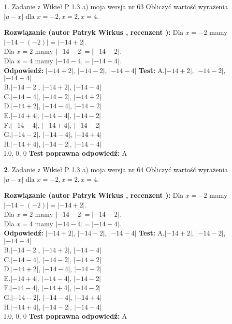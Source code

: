 \documentclass[12pt, a4paper]{article}
\theoremstyle{definition} %
\newtheorem{zad}{}
\newcommand{\zadStart}[1]{\begin{zad}#1\newline}
\newcommand{\zadStop}{\end{zad}}
\newcommand{\rozwStart}[2]{\noindent \textbf{Rozwiązanie (autor #1 , recenzent #2): }\newline}
\newcommand{\rozwStop}{\newline}
\newcommand{\odpStart}{\noindent \textbf{Odpowiedź:}\newline}
\newcommand{\odpStop}{\newline}
\newcommand{\testStart}{\noindent \textbf{Test:}\newline}
\newcommand{\testStop}{\newline}
\newcommand{\kluczStart}{\noindent \textbf{Test poprawna odpowiedź:}\newline}
\newcommand{\kluczStop}{\newline}
\begin{document}
\zadStart{Zadanie z Wikieł P 1.3 a) moja wersja nr 63}
Obliczyć wartość wyrażenia $|a - x|$ dla $x=-2,x=2,x=4$.
\zadStop
\rozwStart{Patryk Wirkus}{}
Dla $x = -2$ mamy $|-14 - (-2)| = |-14 + 2|$.\\
Dla $x = 2$ mamy $|-14 - 2| = |-14 - 2|$.\\
Dla $x = 4$ mamy $|-14 - 4| = |-14 - 4|$.\\
\rozwStop
\odpStart
$|-14 + 2|$, $|-14 - 2|$, $|-14 - 4|$
\odpStop
\testStart
A.$|-14 + 2|$, $|-14 - 2|$, $|-14 - 4|$\\
B.$|-14 - 2|$, $|-14 + 2|$, $|-14 - 4|$\\
C.$|-14 - 4|$, $|-14 - 2|$, $|-14 + 2|$\\
D.$|-14 + 2|$, $|-14 - 4|$, $|-14 - 2|$\\
E.$|-14 + 4|$, $|-14 - 4|$, $|-14 - 2|$\\
F.$|-14 - 4|$, $|-14 + 4|$, $|-14 - 2|$\\
G.$|-14 - 2|$, $|-14 - 4|$, $|-14 + 4|$\\
H.$|-14 + 4|$, $|-14 - 2|$, $|-14 - 4|$\\
I.$0$, $0$, $0$
\testStop
\kluczStart
A
\kluczStop



\zadStart{Zadanie z Wikieł P 1.3 a) moja wersja nr 64}
Obliczyć wartość wyrażenia $|a - x|$ dla $x=-2,x=2,x=4$.
\zadStop
\rozwStart{Patryk Wirkus}{}
Dla $x = -2$ mamy $|-14 - (-2)| = |-14 + 2|$.\\
Dla $x = 2$ mamy $|-14 - 2| = |-14 - 2|$.\\
Dla $x = 4$ mamy $|-14 - 4| = |-14 - 4|$.\\
\rozwStop
\odpStart
$|-14 + 2|$, $|-14 - 2|$, $|-14 - 4|$
\odpStop
\testStart
A.$|-14 + 2|$, $|-14 - 2|$, $|-14 - 4|$\\
B.$|-14 - 2|$, $|-14 + 2|$, $|-14 - 4|$\\
C.$|-14 - 4|$, $|-14 - 2|$, $|-14 + 2|$\\
D.$|-14 + 2|$, $|-14 - 4|$, $|-14 - 2|$\\
E.$|-14 + 4|$, $|-14 - 4|$, $|-14 - 2|$\\
F.$|-14 - 4|$, $|-14 + 4|$, $|-14 - 2|$\\
G.$|-14 - 2|$, $|-14 - 4|$, $|-14 + 4|$\\
H.$|-14 + 4|$, $|-14 - 2|$, $|-14 - 4|$\\
I.$0$, $0$, $0$
\testStop
\kluczStart
A
\kluczStop
\end{document}

